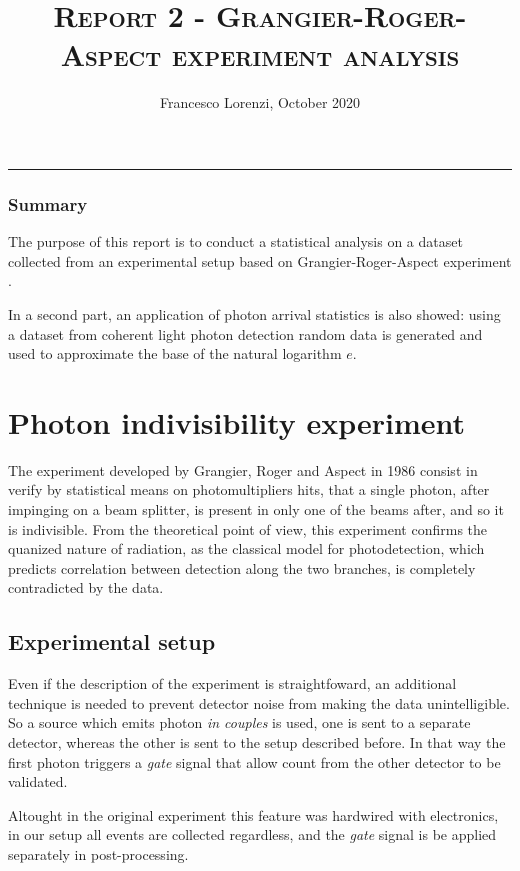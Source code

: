 \documentclass[10pt, final]{article}
\title{\textsc{Report 2 - Grangier-Roger-Aspect experiment analysis}}
\author{Francesco Lorenzi,      October 2020}
\date{}
\begin{document}
\maketitle
\vspace{-25pt}

\begin{center}
	\rule[0pt]{400pt}{0.5pt}
\end{center}
\vspace{-15pt}

\begin{multicols}{2}
\subsubsection*{Summary}
The purpose of this report is to conduct a statistical analysis on a dataset collected from an experimental setup based on Grangier-Roger-Aspect experiment \cite{grangier}. 

In a second part, an application of photon arrival statistics is also showed: using a dataset from coherent light photon detection random data is generated and used to approximate the base of the natural logarithm $e$.

\section{Photon indivisibility experiment}
The experiment developed by Grangier, Roger and Aspect in 1986 consist in verify by statistical means on photomultipliers hits, that a single  photon, after impinging on a beam splitter, is present in only one of the beams after, and so it is indivisible. 
From the theoretical point of view, this experiment confirms the quanized nature of radiation, as the classical model for photodetection, which predicts correlation between detection along the two branches, is completely contradicted by the data.
\subsection*{Experimental setup}
Even if the description of the experiment is straightfoward, an additional technique is needed to prevent detector noise from making the data unintelligible.
So a source which emits photon \emph{in couples} is used, one is sent to a separate detector, whereas the other is sent to the setup described before. In that way the first photon triggers a \emph{gate} signal that allow count from the other detector to be validated.

Altought in the original experiment this feature was hardwired with electronics, in our setup all events are collected regardless, and the \emph{gate} signal is be applied separately in post-processing.


\end{multicols}
\end{document}
